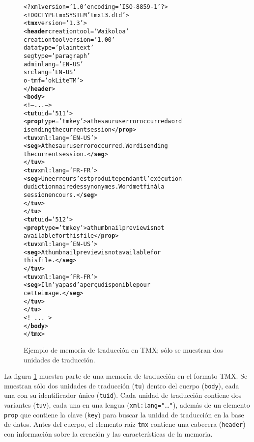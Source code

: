 \begin{figure}
\begin{center}
\begin{alltt}
<?xml version='1.0' encoding='ISO-8859-1' ?>
<!DOCTYPE tmx SYSTEM 'tmx13.dtd'>
<\textbf{tmx} version='1.3'>
 <\textbf{header} creationtool='Waikoloa' 
                  creationtoolversion='1.00'
                  datatype='plaintext'
                  segtype='paragraph'
                  adminlang='EN-US'
                  srclang='EN-US'
                  o-tmf='okLiteTM'>
 </\textbf{header}>
 <\textbf{body}>
 <!-- ... -->
   <\textbf{tu} tuid='511'>
   <\textbf{prop} type='tmkey'>a thesaurus error occurred word 
   is ending the current session</\textbf{prop}>
   <\textbf{tuv} xml:lang='EN-US'> 
    <\textbf{seg}>A thesaurus error occurred. Word is ending 
    the current session.</\textbf{seg}>
   </\textbf{tuv}>
   <\textbf{tuv} xml:lang='FR-FR'> 
    <\textbf{seg}>Une erreur s'est produite pendant l'exécution 
    du dictionnaire des synonymes. Word met fin à la 
    session en cours.</\textbf{seg}>
   </\textbf{tuv}>
  </\textbf{tu}>
  <\textbf{tu} tuid='512'>
   <\textbf{prop} type='tmkey'>a thumbnail preview is not 
    available for this file</\textbf{prop}>
   <\textbf{tuv} xml:lang='EN-US'>
    <\textbf{seg}>A thumbnail preview is not available for
         this file.</\textbf{seg}>
   </\textbf{tuv}>
   <\textbf{tuv} xml:lang='FR-FR'>
    <\textbf{seg}>Il n'y a pas d'aperçu disponible pour
         cette image.</\textbf{seg}>
   </\textbf{tuv}>
  </\textbf{tu}>
  <!-- ... -->
</\textbf{body}>
</\textbf{tmx}>
\end{alltt}
\end{center}
\caption{Ejemplo de memoria de traducción en TMX; sólo se muestran dos
  unidades de traducción.}
\label{fg:tmx}
\end{figure}

La figura \ref{fg:tmx} muestra parte de una memoria de traducción en el formato TMX. Se muestran sólo dos unidades de traducción (\texttt{tu}) dentro del cuerpo (\texttt{body}), cada una con su identificador único (\texttt{tuid}). Cada unidad de traducción contiene dos variantes (\texttt{tuv}), cada una en una lengua (\texttt{xml:lang="}\ldots\texttt{"}), además de un elemento \texttt{prop} que contiene la clave (\texttt{key}) para buscar la unidad de traducción en la base de datos. Antes del cuerpo, el elemento raíz \texttt{tmx} contiene una cabecera (\texttt{header}) con información sobre la creación y las características de la memoria. 

